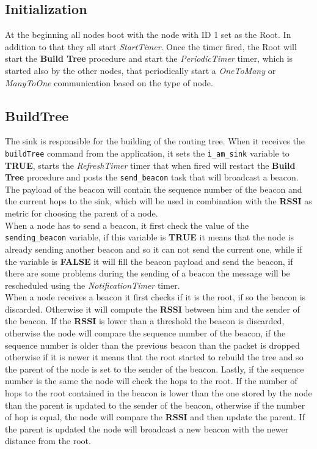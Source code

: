 \documentclass{article}
\begin{document}
\subsection{Initialization}
At the beginning all nodes boot with the node with ID 1 set as the Root. In addition to that they all start \emph{StartTimer}. Once the timer fired, the Root will start the \textbf{Build Tree} procedure and start the \emph{PeriodicTimer} timer, which is started also by the other nodes, that periodically start a \emph{OneToMany} or \emph{ManyToOne} communication based on the type of node.
\subsection{BuildTree}
    The sink is responsible for the building of the routing tree. When it receives the \texttt{buildTree} command from the application, it sets the \texttt{i\_am\_sink} variable to \textbf{TRUE}, starts the \emph{RefreshTimer} timer that when fired will restart the \textbf{Build Tree} procedure and posts the \texttt{send\_beacon} task that will broadcast a beacon. The payload of the beacon will contain the sequence number of the beacon and the current hops to the sink, which will be used in combination with the \textbf{RSSI} as metric for choosing the parent of a node.\\
    When a node has to send a beacon, it first check the value of the \texttt{sending\_beacon} variable, if this variable is \textbf{TRUE} it means that the node is already sending another beacon and so it can not send the current one, while if the variable is \textbf{FALSE} it will fill the beacon payload and send the beacon, if there are some problems during the sending of a beacon the message will be rescheduled using the \emph{NotificationTimer} timer. \\
    When a node receives a beacon it first checks if it is the root, if so the beacon is discarded. Otherwise it will compute the \textbf{RSSI} between him and the sender of the beacon. If the \textbf{RSSI} is lower than a threshold the beacon is discarded, otherwise the node will compare the sequence number of the beacon, if the sequence number is older than the previous beacon than the packet is dropped otherwise if it is newer it means that the root started to rebuild the tree and so the parent of the node is set to the sender of the beacon. Lastly, if the sequence number is the same the node will check the hops to the root. If the number of hops to the root contained in the beacon is lower than the one stored by the node than the parent is updated to the sender of the beacon, otherwise if the number of hop is equal, the node will compare the \textbf{RSSI} and then update the parent. If the parent is updated the node will broadcast a new beacon with the newer distance from the root.
\end{document}
